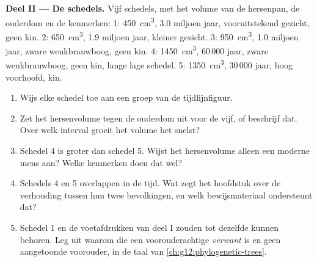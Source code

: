 \begin{problem}
\medskip
\noindent\textbf{Deel II --- De schedels.}
Vijf schedels, met het volume van de hersenpan, de ouderdom en de
kenmerken:
1: \qty{450}{cm^3}, 3.0 miljoen jaar, vooruitstekend gezicht, geen kin.
2: \qty{650}{cm^3}, 1.9 miljoen jaar, kleiner gezicht.
3: \qty{950}{cm^3}, 1.0 miljoen jaar, zware wenkbrauwboog, geen kin.
4: \qty{1450}{cm^3}, 60\,000 jaar, zware wenkbrauwboog, geen kin, lange
lage schedel.
5: \qty{1350}{cm^3}, 30\,000 jaar, hoog voorhoofd, kin.
\begin{enumerate}[resume]
  \item Wijs elke schedel toe aan een groep van de tijdlijnfiguur.
  \item Zet het hersenvolume tegen de ouderdom uit voor de vijf, of
        beschrijf dat. Over welk interval groeit het volume het snelst?
  \item Schedel 4 is groter dan schedel 5. Wijst het hersenvolume alleen
        een moderne mens aan? Welke kenmerken doen dat wel?
  \item Schedels 4 en 5 overlappen in de tijd. Wat zegt het hoofdstuk over
        de verhouding tussen hun twee bevolkingen, en welk bewijsmateriaal
        ondersteunt dat?
  \item Schedel 1 en de voetafdrukken van deel I zouden tot dezelfde 
        kunnen behoren. Leg uit waarom die  een voorouderachtige
        \emph{verwant} is en geen aangetoonde voorouder, in de taal van
        \cref{ch:g12:phylogenetic-trees}.
\end{enumerate}


\end{problem}
